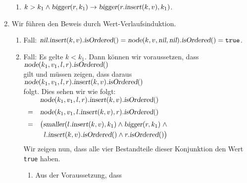 \documentclass{article}
\begin{document}
\begin{enumerate}
\begin{enumerate}
      \item $k > k_1 \wedge \textsl{bigger}(r,k_1) \rightarrow \textsl{bigger}(r.\textsl{insert}(k,v),k_1)$.
      \end{enumerate}
\item Wir f\"uhren den Beweis durch Wert-Verlaufsinduktion.
      \begin{enumerate}
      \item Fall:
            $\textsl{nil}.\textsl{insert}(k,v).\textsl{isOrdered}() =
             \textsl{node}(k,v,\textsl{nil},\textsl{nil}).\textsl{isOrdered}() = \texttt{true}$.
      \item Fall: Es gelte $k < k_1$.  Dann k\"onnen wir voraussetzen, dass
            \\[0.2cm]
            \hspace*{1.3cm}
            $\textsl{node}(k_1,v_1,l,r).\textsl{isOrdered}()$
            \\[0.2cm]
            gilt und m\"ussen zeigen, dass daraus
            \\[0.2cm]
            \hspace*{1.3cm}
            $\textsl{node}(k_1,v_1,l,r).\textsl{insert}(k,v).\textsl{isOrdered}()$
            \\[0.2cm]
            folgt.  Dies sehen wir wie folgt:
            \\[0.2cm]
            \hspace*{1.3cm}
            $\begin{array}[t]{cl}
                & \textsl{node}(k_1,v_1,l,r).\textsl{insert}(k,v).\textsl{isOrdered}() \\[0.2cm]
              = & \textsl{node}(k_1,v_1,l.\textsl{insert}(k,v),r).\textsl{isOrdered}()     \\[0.2cm]
              = & \bigl(\textsl{smaller}(l.\textsl{insert}(k,v), k_1) \wedge
                        \textsl{bigger}(r, k_1) \;\wedge            \\[0.1cm]
                & \;\;  l.\textsl{insert}(k,v).\textsl{isOrdered}()    \wedge
                        r.\textsl{isOrdered}()\bigr)\\[0.2cm]
            \end{array}
            $
            \\[0.2cm]
            Wir zeigen nun, dass alle vier Bestandteile dieser Konjunktion den Wert
            \texttt{true} haben.
            \begin{enumerate}
            \item Aus der Voraussetzung, dass

\end{enumerate}
\end{enumerate}
\end{enumerate}
\end{document}
